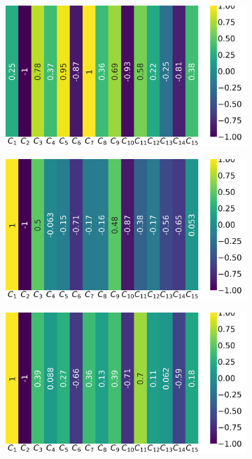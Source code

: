 \begin{figure}[!ht]
	\centering
	\begin{subfigure}{0.49\linewidth}
		\includegraphics[width=\linewidth]{img/qlp_corr/Cnmod_coil0.png}
	\end{subfigure}
	\begin{subfigure}{0.49\linewidth}
		\includegraphics[width=\linewidth]{img/qlp_corr/Cnmod_coil1.png}
	\end{subfigure}
	\begin{subfigure}{0.49\linewidth}
		\includegraphics[width=\linewidth]{img/qlp_corr/Cnmod_coil2.png}

\end{subfigure}
\end{figure}

